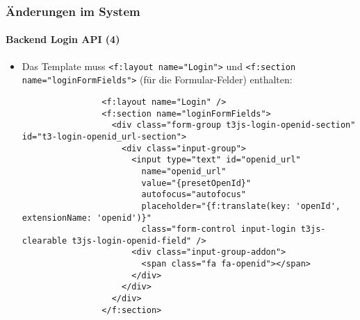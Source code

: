 \begin{frame}[fragile]
	\frametitle{Änderungen im System}
	\framesubtitle{Backend Login API (4)}

	\lstset{basicstyle=\tiny\ttfamily}

	\begin{itemize}

		\item Das Template muss
			\texttt{<f:layout name="Login">} und\newline
			\texttt{<f:section name="loginFormFields">}
			(für die Formular-Felder) enthalten:

			\begin{lstlisting}
				<f:layout name="Login" />
				<f:section name="loginFormFields">
				  <div class="form-group t3js-login-openid-section" id="t3-login-openid_url-section">
				    <div class="input-group">
				      <input type="text" id="openid_url"
				        name="openid_url"
				        value="{presetOpenId}"
				        autofocus="autofocus"
				        placeholder="{f:translate(key: 'openId', extensionName: 'openid')}"
				        class="form-control input-login t3js-clearable t3js-login-openid-field" />
				      <div class="input-group-addon">
				        <span class="fa fa-openid"></span>
				      </div>
				    </div>
				  </div>
				</f:section>
			\end{lstlisting}

	\end{itemize}

\end{frame}


